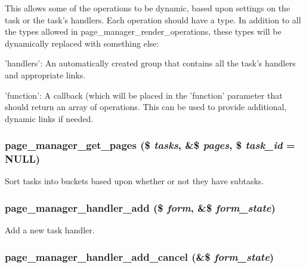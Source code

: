 This allows some of the operations to be dynamic, based upon settings on the task or the task's handlers. Each operation should have a type. In addition to all the types allowed in page\_\-manager\_\-render\_\-operations, these types will be dynamically replaced with something else:
\begin{DoxyItemize}
\item 'handlers': An automatically created group that contains all the task's handlers and appropriate links.
\item 'function': A callback (which will be placed in the 'function' parameter that should return an array of operations. This can be used to provide additional, dynamic links if needed. 
\end{DoxyItemize}\hypertarget{page__manager_8admin_8inc_a1dd523dbb3fdf5808af244fe67d95776}{
\subsubsection[{page\_\-manager\_\-get\_\-pages}]{\setlength{\rightskip}{0pt plus 5cm}page\_\-manager\_\-get\_\-pages (\$ {\em tasks}, \/  \&\$ {\em pages}, \/  \$ {\em task\_\-id} = {\ttfamily NULL})}}
\label{page__manager_8admin_8inc_a1dd523dbb3fdf5808af244fe67d95776}
Sort tasks into buckets based upon whether or not they have subtasks. \hypertarget{page__manager_8admin_8inc_ac106674f4aa3ba8f1f3b8940f663e230}{
\subsubsection[{page\_\-manager\_\-handler\_\-add}]{\setlength{\rightskip}{0pt plus 5cm}page\_\-manager\_\-handler\_\-add (\$ {\em form}, \/  \&\$ {\em form\_\-state})}}
\label{page__manager_8admin_8inc_ac106674f4aa3ba8f1f3b8940f663e230}
Add a new task handler. \hypertarget{page__manager_8admin_8inc_a47ad5fa085b38af8dec0cc441fcc770f}{
\subsubsection[{page\_\-manager\_\-handler\_\-add\_\-cancel}]{\setlength{\rightskip}{0pt plus 5cm}page\_\-manager\_\-handler\_\-add\_\-cancel (\&\$ {\em form\_\-state})}}
